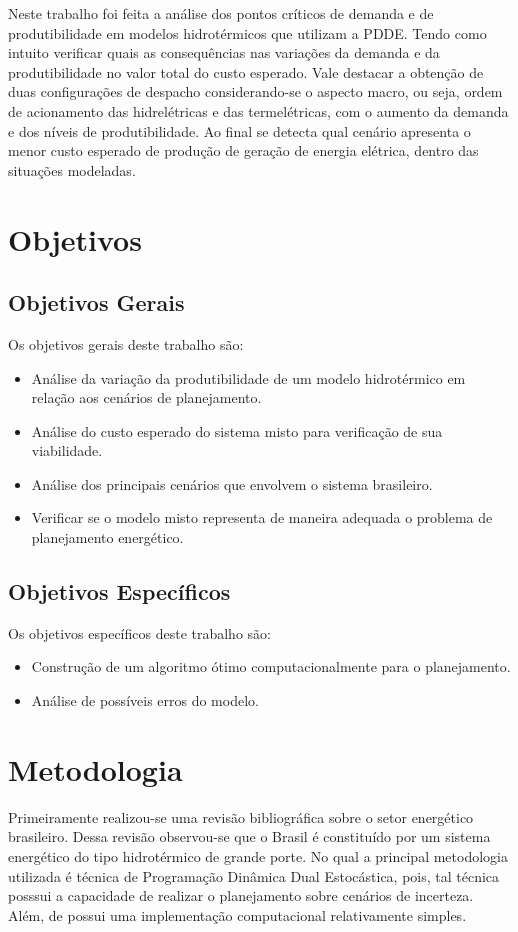 Neste trabalho foi feita a an\'alise dos pontos cr\'iticos de demanda e de produtibilidade em modelos hidrot\'ermicos que utilizam a PDDE.
Tendo como intuito verificar quais as consequ\^encias nas varia\c c\~oes da demanda e da produtibilidade no valor total do custo esperado.
Vale destacar a obten\c c\~ao de duas configura\c c\~oes de despacho considerando-se o aspecto macro, ou seja, ordem de acionamento das 
hidrel\'etricas e das termel\'etricas, com o aumento da demanda e dos n\'iveis de produtibilidade.
Ao final se detecta qual cen\'ario apresenta o menor custo esperado de produ\c c\~ao de gera\c c\~ao de energia el\'etrica,
dentro das situa\c c\~oes modeladas.

 \section{Objetivos}
\subsection{Objetivos Gerais}
Os objetivos gerais deste trabalho s\~ao:
\begin{itemize}
	\item An\'alise da varia\c c\~ao da produtibilidade de um modelo hidrot\'ermico em rela\c c\~ao aos cen\'arios de
		planejamento. 
	\item An\'alise do custo esperado do sistema misto para verifica\c c\~ao de sua viabilidade.
	\item An\'alise dos principais cen\'arios que envolvem o sistema brasileiro. 
	\item Verificar se o modelo misto representa de maneira adequada o problema de planejamento energ\'etico.
\end{itemize}

\subsection{Objetivos Espec\'ificos}
Os objetivos espec\'ificos deste trabalho s\~ao:
\begin{itemize}
	\item Constru\c c\~ao de um algoritmo \'otimo  computacionalmente para o planejamento. 
	\item An\'alise de poss\'iveis erros do modelo.
\end{itemize}
\section{Metodologia}
Primeiramente realizou-se uma revis\~ao bibliogr\'afica sobre o setor energ\'etico brasileiro. Dessa revis\~ao
observou-se que o Brasil \'e constitu\'ido por um sistema energ\'etico do tipo hidrot\'ermico de grande porte. No qual a
principal metodologia utilizada \'e t\'ecnica de Programa\c c\~ao Din\^amica Dual Estoc\'astica, pois, tal t\'ecnica
posssui a capacidade de realizar o planejamento sobre cen\'arios de incerteza. Al\'em, de possui uma implementa\c c\~ao
computacional relativamente simples.

